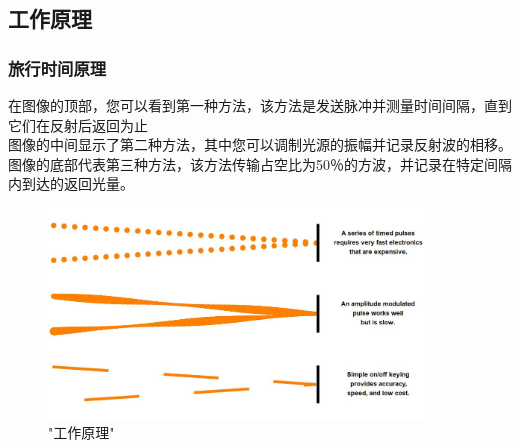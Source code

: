 \documentclass[UTF8]{ctexart}
\begin{document}
\subsection{工作原理}
\subsubsection{旅行时间原理}
在图像的顶部，您可以看到第一种方法，该方法是发送脉冲并测量时间间隔，直到它们在反射后返回为止\\
图像的中间显示了第二种方法，其中您可以调制光源的振幅并记录反射波的相移。\\
图像的底部代表第三种方法，该方法传输占空比为50％的方波，并记录在特定间隔内到达的返回光量。\\
\begin{figure}
	\centering
	\includegraphics[width=0.9\textwidth]{principle.png}
	\caption{"工作原理"}
\end{figure}
\end{document}
